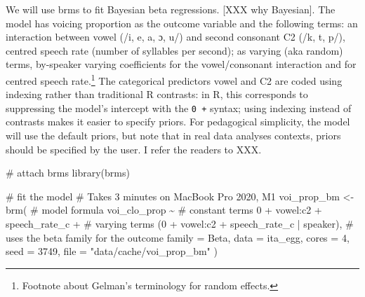 \documentclass[
  authoryear,
  preprint,
  3p]{elsarticle}
\newenvironment{Shaded}{\begin{snugshade}}{\end{snugshade}}
\newcommand{\AttributeTok}[1]{\textcolor[rgb]{0.40,0.45,0.13}{#1}}
\newcommand{\CommentTok}[1]{\textcolor[rgb]{0.37,0.37,0.37}{#1}}
\newcommand{\DecValTok}[1]{\textcolor[rgb]{0.68,0.00,0.00}{#1}}
\newcommand{\FunctionTok}[1]{\textcolor[rgb]{0.28,0.35,0.67}{#1}}
\newcommand{\NormalTok}[1]{\textcolor[rgb]{0.00,0.23,0.31}{#1}}
\newcommand{\OtherTok}[1]{\textcolor[rgb]{0.00,0.23,0.31}{#1}}
\newcommand{\SpecialCharTok}[1]{\textcolor[rgb]{0.37,0.37,0.37}{#1}}
\newcommand{\StringTok}[1]{\textcolor[rgb]{0.13,0.47,0.30}{#1}}
\begin{document}
We will use brms to fit Bayesian beta regressions. {[}XXX why
Bayesian{]}. The model has voicing proportion as the outcome variable
and the following terms: an interaction between vowel (/i, e, a, ɔ, u/)
and second consonant C2 (/k, t, p/), centred speech rate (number of
syllables per second); as varying (aka random) terms, by-speaker varying
coefficients for the vowel/consonant interaction and for centred speech
rate.\footnote{Footnote about Gelman's terminology for random effects.}
The categorical predictors vowel and C2 are coded using indexing rather
than traditional R contrasts: in R, this corresponds to suppressing the
model's intercept with the \texttt{0\ +} syntax; using indexing instead
of contrasts makes it easier to specify priors. For pedagogical
simplicity, the model will use the default priors, but note that in real
data analyses contexts, priors should be specified by the user. I refer
the readers to XXX.

\begin{Shaded}
\begin{Highlighting}[]
\CommentTok{\# attach brms}
\FunctionTok{library}\NormalTok{(brms)}

\CommentTok{\# fit the model}
\CommentTok{\# Takes 3 minutes on MacBook Pro 2020, M1}
\NormalTok{voi\_prop\_bm }\OtherTok{\textless{}{-}} \FunctionTok{brm}\NormalTok{(}
  \CommentTok{\# model formula}
\NormalTok{  voi\_clo\_prop }\SpecialCharTok{\textasciitilde{}}
    \CommentTok{\# constant terms}
    \DecValTok{0} \SpecialCharTok{+}\NormalTok{ vowel}\SpecialCharTok{:}\NormalTok{c2 }\SpecialCharTok{+}\NormalTok{ speech\_rate\_c }\SpecialCharTok{+}
    \CommentTok{\# varying terms}
\NormalTok{    (}\DecValTok{0} \SpecialCharTok{+}\NormalTok{ vowel}\SpecialCharTok{:}\NormalTok{c2 }\SpecialCharTok{+}\NormalTok{ speech\_rate\_c }\SpecialCharTok{|}\NormalTok{ speaker),}
  \CommentTok{\# uses the beta family for the outcome}
  \AttributeTok{family =}\NormalTok{ Beta,}
  \AttributeTok{data =}\NormalTok{ ita\_egg,}
  \AttributeTok{cores =} \DecValTok{4}\NormalTok{,}
  \AttributeTok{seed =} \DecValTok{3749}\NormalTok{,}
  \AttributeTok{file =} \StringTok{"data/cache/voi\_prop\_bm"}
\NormalTok{)}
\end{Highlighting}
\end{Shaded}
\end{document}
